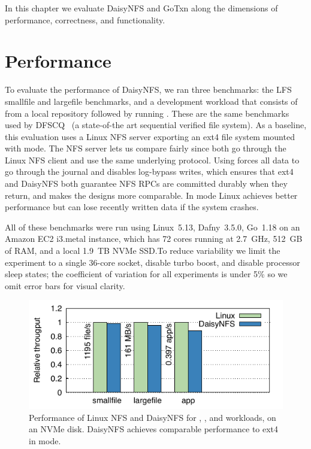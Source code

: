 In this chapter we evaluate DaisyNFS and GoTxn along the dimensions of
performance, correctness, and functionality.

\section{Performance}
\label{sec:eval:bench}

To evaluate the performance of DaisyNFS, we ran three benchmarks: the LFS smallfile
and largefile benchmarks, and a development workload that consists of  from a local repository followed by running . These are the same
benchmarks used by DFSCQ~\cite{chen:dfscq} (a state-of-the art sequential
verified file system). As a baseline, this evaluation uses a Linux
NFS server exporting an ext4 file system mounted with  mode.
The NFS server lets us compare fairly since both go through the Linux NFS client
and use the same underlying protocol. Using  forces all data to
go through the journal and disables log-bypass writes, which ensures that
ext4 and DaisyNFS both guarantee NFS RPCs are committed durably when they
return, and makes the designs more comparable. In
 mode Linux achieves better performance but can
lose recently written data if the system crashes.

All of these benchmarks were run using Linux~5.13, Dafny~3.5.0, Go~1.18 on an Amazon
EC2 i3.metal instance, which has 72 cores running at 2.7~GHz, 512~GB of RAM, and a local 1.9~TB
NVMe SSD.\@ To reduce variability we limit the experiment to a single 36-core
socket, disable turbo boost, and disable processor sleep states; the coefficient
of variation for all experiments is under 5\% so we omit error bars for visual
clarity.



\begin{figure}
  \includegraphics{daisy-nfs/fig/bench.pdf}
  \caption[Performance for smallfile, largefile, and app benchmarks]%
  {Performance of Linux NFS and DaisyNFS for ,
    , and  workloads, on an NVMe disk.
    DaisyNFS achieves comparable performance to ext4 in  mode.}
  \label{fig:eval:bench}
\end{figure}

